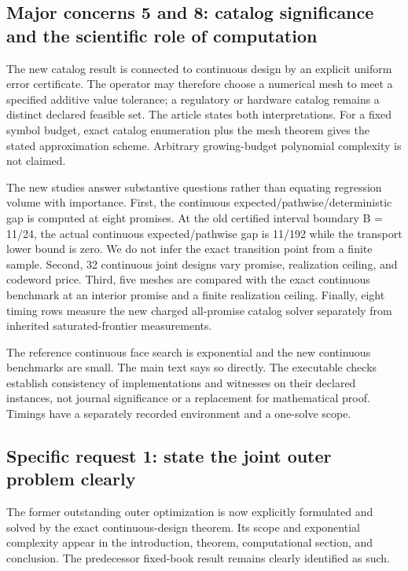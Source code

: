 \documentclass[11pt,letterpaper]{article}
\begin{document}
\subsection*{Major concerns 5 and 8: catalog significance and the scientific role of computation}


The new catalog result is connected to continuous design by an explicit uniform error certificate. The operator may therefore choose a numerical mesh to meet a specified additive value tolerance; a regulatory or hardware catalog remains a distinct declared feasible set. The article states both interpretations. For a fixed symbol budget, exact catalog enumeration plus the mesh theorem gives the stated approximation scheme. Arbitrary growing-budget polynomial complexity is not claimed.



The new studies answer substantive questions rather than equating regression volume with importance. First, the continuous expected/pathwise/deterministic gap is computed at eight promises. At the old certified interval boundary B = 11/24, the actual continuous expected/pathwise gap is 11/192 while the transport lower bound is zero. We do not infer the exact transition point from a finite sample. Second, 32 continuous joint designs vary promise, realization ceiling, and codeword price. Third, five meshes are compared with the exact continuous benchmark at an interior promise and a finite realization ceiling. Finally, eight timing rows measure the new charged all-promise catalog solver separately from inherited saturated-frontier measurements.



The reference continuous face search is exponential and the new continuous benchmarks are small. The main text says so directly. The executable checks establish consistency of implementations and witnesses on their declared instances, not journal significance or a replacement for mathematical proof. Timings have a separately recorded environment and a one-solve scope.



\subsection*{Specific request 1: state the joint outer problem clearly}


The former outstanding outer optimization is now explicitly formulated and solved by the exact continuous-design theorem. Its scope and exponential complexity appear in the introduction, theorem, computational section, and conclusion. The predecessor fixed-book result remains clearly identified as such.
\end{document}
